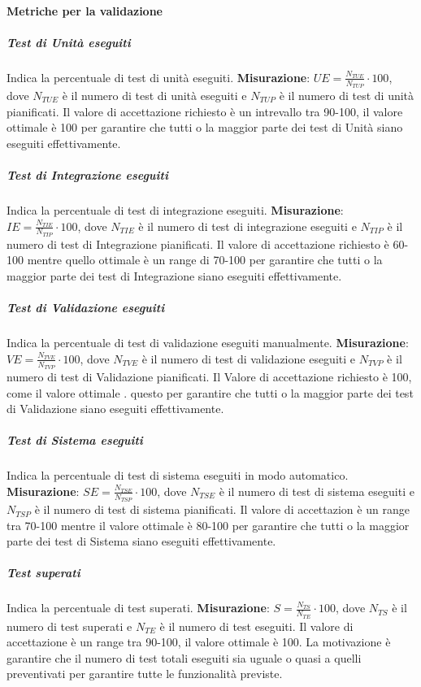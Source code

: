 \paragraph{Metriche per la validazione}


\subparagraph{Test di Unità eseguiti}
Indica la percentuale di test di unità eseguiti.
\textbf{Misurazione}: $UE=\frac{N_{TUE}}{N_{TUP}} \cdot 100$, dove $N_{TUE}$ è il numero di test di unità eseguiti e $N_{TUP}$ è il numero di test di unità pianificati.
Il valore di accettazione richiesto è un intrevallo tra 90-100, il valore ottimale è 100 per garantire che tutti o la maggior parte dei test di Unità siano eseguiti effettivamente.

\subparagraph{Test di Integrazione eseguiti}
Indica la percentuale di test di integrazione eseguiti.
\textbf{Misurazione}: $IE=\frac{N_{TIE}}{N_{TIP}} \cdot 100$, dove $N_{TIE}$ è il numero di test di integrazione eseguiti e $N_{TIP}$ è il numero di test di Integrazione pianificati.
Il valore di accettazione richiesto è 60-100 mentre quello ottimale è un range di 70-100 per	garantire che tutti o la maggior parte dei test di Integrazione siano eseguiti effettivamente. 

\subparagraph{Test di Validazione eseguiti}
Indica la percentuale di test di validazione eseguiti manualmente.
\textbf{Misurazione}: $VE=\frac{N_{TVE}}{N_{TVP}} \cdot 100$, dove $N_{TVE}$ è il numero di test di validazione eseguiti e $N_{TVP}$ è il numero di test di Validazione pianificati.
Il Valore di accettazione richiesto è 100, come il valore ottimale . questo per garantire che tutti o la maggior parte dei test di Validazione siano eseguiti effettivamente. 

\subparagraph{Test di Sistema eseguiti}
Indica la percentuale di test di sistema eseguiti in modo automatico.
\textbf{Misurazione}: $SE=\frac{N_{TSE}}{N_{TSP}} \cdot 100$, dove $N_{TSE}$ è il numero di test di sistema eseguiti e $N_{TSP}$ è il numero di test di sistema pianificati.
Il valore di accettazion è un range tra 70-100 mentre il valore ottimale è 80-100 per garantire che tutti o la maggior parte dei test di Sistema siano eseguiti effettivamente.

\subparagraph{Test superati}
Indica la percentuale di test superati.
\textbf{Misurazione}: $S=\frac{N_{TS}}{N_{TE}} \cdot 100$, dove $N_{TS}$ è il numero di test superati e $N_{TE}$ è il numero di test eseguiti.
Il valore di accettazione è un range tra 90-100, il valore ottimale è 100. La motivazione è  garantire che il numero di test totali eseguiti sia uguale o quasi a quelli preventivati per garantire tutte le funzionalità previste. \\

